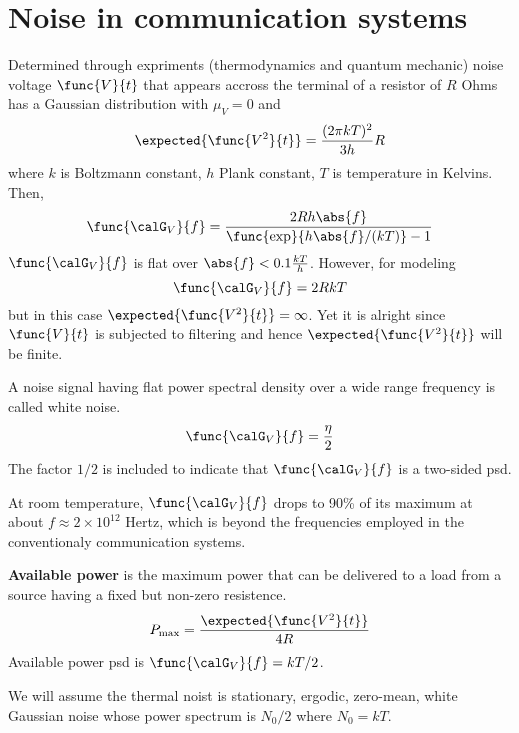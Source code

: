 \section{Noise in communication systems}
Determined through expriments (thermodynamics and quantum mechanic) noise voltage \(\func{V}{t}\) that appears accross the terminal of a resistor of \(R\) Ohms has a Gaussian distribution with \(\mu_V= 0\) and 
\begin{equation*}
    \expected{\func{V^2}{t}} = \dfrac{(2\pi k T)^2}{3h} R 
\end{equation*}
where \(k\) is Boltzmann constant, \(h\) Plank constant, \(T\) is temperature in Kelvins. Then, 
\begin{equation*}
    \func{\calG_V}{f} = \dfrac{2 R h \abs{f}}{\func{\exp}{h \abs{f}/ (kT)} - 1} 
\end{equation*}
\(\func{\calG_V}{f}\) is flat over \(\abs{f} < 0.1 \frac{kT}{h}\). However, for modeling 
\begin{equation*}
    \func{\calG_V}{f} = 2RkT
\end{equation*}
but in this case \(\expected{\func{V^2}{t}} = \infty\). Yet it is alright since \(\func{V}{t}\) is subjected to filtering and hence \(\expected{\func{V^2}{t}}\) will be finite.

\begin{definition}
    A noise signal having flat power spectral density over a wide range frequency is called white noise.
\begin{equation*}
    \func{\calG_V}{f} = \dfrac{\eta}{2}
\end{equation*}
The factor \(1/2\) is included to indicate that \(\func{\calG_V}{f}\) is a two-sided psd.
\end{definition}

At room temperature, \(\func{\calG_V}{f}\) drops to 90\% of its maximum at about \(f \approx 2 \times 10^12\) Hertz, which is beyond the frequencies employed in the conventionaly communication systems.

\textbf{Available power} is the maximum power that can be delivered to a load from a source having a fixed but non-zero resistence. 
\begin{equation*}
        P_{\max} = \dfrac{\expected{\func{V^2}{t}}}{4R}
\end{equation*}
Available power psd is \(\func{\calG_V}{f} = kT/2\). 

We will assume the thermal noist is stationary, ergodic, zero-mean, white Gaussian noise whose power spectrum is \(N_0/2\) where \(N_0 = kT\).

